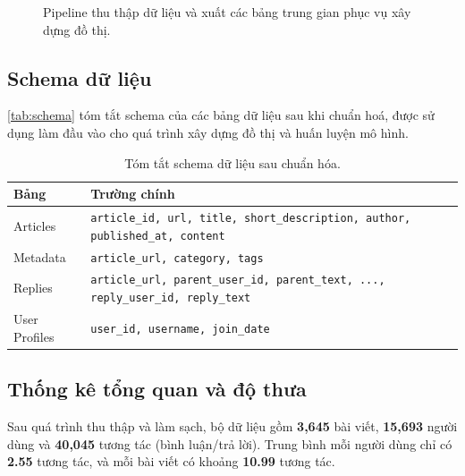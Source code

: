 \documentclass[11pt]{article}
\begin{document}
\begin{figure}[t]
    \caption{Pipeline thu thập dữ liệu và xuất các bảng trung gian phục vụ xây dựng đồ thị.}
    \label{fig:crawler-pipeline}
\end{figure}

\subsection{Schema dữ liệu}
\autoref{tab:schema} tóm tắt schema của các bảng dữ liệu sau khi chuẩn hoá,
được sử dụng làm đầu vào cho quá trình xây dựng đồ thị và huấn luyện mô hình.

\begin{table}[t]
    \centering
    \small
    \setlength{\tabcolsep}{4pt}
    \begin{tabular}{l p{5.6cm}}
        \toprule
        \textbf{Bảng} & \textbf{Trường chính}                                                                    \\
        \midrule
        Articles      & \texttt{article\_id, url, title, short\_description, author, published\_at, content}     \\
        Metadata      & \texttt{article\_url, category, tags}                                                    \\
        Replies       & \texttt{article\_url, parent\_user\_id, parent\_text, ..., reply\_user\_id, reply\_text} \\
        User Profiles & \texttt{user\_id, username, join\_date}                                                  \\
        \bottomrule
    \end{tabular}
    \caption{Tóm tắt schema dữ liệu sau chuẩn hóa.}
    \label{tab:schema}
\end{table}

\subsection{Thống kê tổng quan và độ thưa}
Sau quá trình thu thập và làm sạch,
bộ dữ liệu gồm \textbf{3,645} bài viết, \textbf{15,693} người dùng và \textbf{40,045} tương tác (bình luận/trả lời).
Trung bình mỗi người dùng chỉ có \textbf{2.55} tương tác,
và mỗi bài viết có khoảng \textbf{10.99} tương tác.
\end{document}
